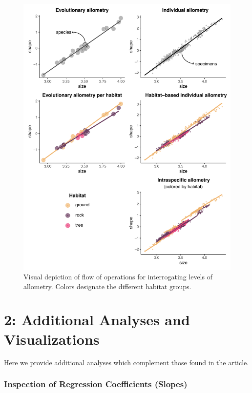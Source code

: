 \documentclass[
  11pt,
]{article}
\begin{document}
\begin{figure}[H]

{\centering \includegraphics[width=0.9\linewidth]{Figs/figure_sup_allometries_ill_v2} 

}

\caption{Visual depiction of flow of operations for interrogating levels of allometry. Colors designate the different habitat groups.}\label{fig:unnamed-chunk-2}
\end{figure}

\newpage

\hypertarget{additional-analyses-and-visualizations}{%
\section{2: Additional Analyses and
Visualizations}\label{additional-analyses-and-visualizations}}

Here we provide additional analyses which complement those found in the
article.

\hypertarget{inspection-of-regression-coefficients-slopes}{%
\subsubsection{Inspection of Regression Coefficients
(Slopes)}\label{inspection-of-regression-coefficients-slopes}}
\end{document}
